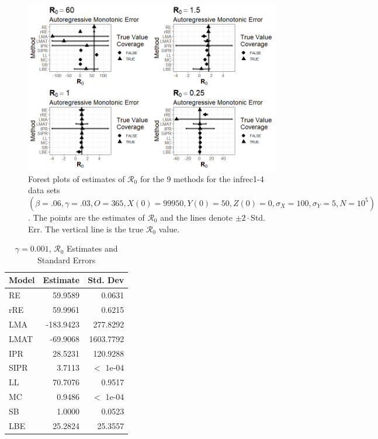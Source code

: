\documentclass[12pt]{article}
\newcommand{\xxsir}{\ensuremath{9} } %
\newcommand{\rr}{\ensuremath{\mathcal{R}_0}}
\begin{document}
\begin{figure}[H]
	\centering
	\includegraphics[scale=0.5]{images/parchange_arm.tiff}
	\caption{Forest plots of estimates of $\rr$ for the \xxsir methods for the infrec1-4 data sets $(\beta=.06, \gamma=.03, O=365, X(0)=99950, Y(0)=50, Z(0)=0, \sigma_X=100, \sigma_Y=5, N=10^5)$.  The points are the estimates of $\rr$ and the lines denote $\pm 2\cdot $Std. Err.  The vertical line is the true $\rr$ value.}
\end{figure}
\begin{table}[H]
	
	\centering
	\begin{tabular}[t]{l|r|r}
		\hline
		Model & Estimate & Std. Dev\\
		\hline
		RE & 59.9589 & 0.0631\\
		\hline
		rRE & 59.9961 & 0.6215\\
		\hline
		LMA & -183.9423 & 277.8292\\
		\hline
		LMAT & -69.9068 & 1603.7792\\
		\hline
		IPR & 28.5231 & 120.9288\\
		\hline
		SIPR & 3.7113 & $<$ 1e-04\\
		\hline
		LL & 70.7076 & 0.9517\\
		\hline
		MC & 0.9486 & $<$ 1e-04\\
		\hline
		SB & 1.0000 & 0.0523\\
		\hline
		LBE & 25.2824 & 25.3557\\
		\hline
	\end{tabular}
	\caption{$\gamma = 0.001$, $\rr$ Estimates and Standard Errors}
\end{table}
\end{document}
